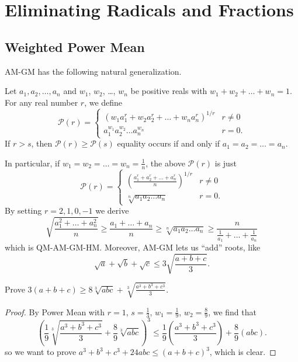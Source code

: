 \documentclass[11pt]{scrartcl}
\begin{document}
\section{Eliminating Radicals and Fractions}
\subsection{Weighted Power Mean}
AM-GM has the following natural generalization.
\begin{theorem}
   Let $a_1, a_2, \dots, a_n$ and $w_1$, $w_2$, \dots, $w_n$  be positive reals with $w_1+w_2+\dots+w_n=1$.
  For any real number $r$, we define
  \[ \mathcal P(r) =
    \begin{cases}
      \left( w_1 a_1^r + w_2 a_2^r + \dots + w_n a_n^r \right)^{1/r} & r \neq 0 \\[1em]
      a_1^{w_1} a_2^{w_2} \dots a_n^{w_n} & r = 0.
    \end{cases}
  \]
  If $r>s$, then $\mathcal P(r) \ge \mathcal P(s)$ equality occurs if and only if $a_1 = a_2 = \dots = a_n$.
\end{theorem}
In particular, if $w_1 = w_2 = \dots = w_n = \frac 1n$, the above $\mathcal P(r)$ is just
  \[ \mathcal P(r) =
    \begin{cases}
      \left( \displaystyle\frac{a_1^r + a_2^r + \dots + a_n^r}{n} \right)^{1/r} & r \neq 0 \\[1.5em]
      \sqrt[n]{a_1a_2 \dots a_n} & r = 0.
    \end{cases}
  \]
By setting $r=2,1,0,-1$ we derive
\[ \sqrt{\frac{a_1^2+\dots+a_n^2}{n}}
  \ge \frac{a_1+\dots+a_n}{n}
  \ge \sqrt[n]{a_1a_2 \dots a_n}
  \ge \frac{n}{\frac{1}{a_1} + \dots + \frac{1}{a_n}} \]
which is QM-AM-GM-HM. Moreover, AM-GM lets us ``add'' roots, like
\[ \sqrt a + \sqrt b + \sqrt c \le 3\sqrt{\frac{a+b+c}{3}}. \]

\begin{example}
   Prove $3(a+b+c) \ge 8\sqrt[3]{abc} + \sqrt[3]{\frac{a^3+b^3+c^3}{3}}$.
\end{example}
\begin{proof}
  By Power Mean with $r=1$, $s=\frac 13$, $w_1 = \frac 19$, $w_2 = \frac 89$, we find that
  \[ \left( \frac 19 \sqrt[3]{\frac{a^3+b^3+c^3}{3}} + \frac 89 \sqrt[3]{abc} \right)^3
  \le \frac19 \left( \frac{a^3+b^3+c^3}{3} \right) + \frac 89 \left( abc \right). \]
  so we want to prove $a^3+b^3+c^3+24abc \le (a+b+c)^3$, which is clear.
\end{proof}
\end{document}
